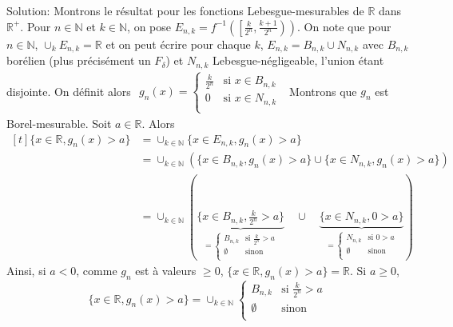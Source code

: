 \documentclass{report}
\begin{document}
Solution: Montrons le résultat pour les fonctions Lebesgue-mesurables de $\mathbb R$ dans $\mathbb R^+$. Pour $n\in \mathbb N$ et $k \in \mathbb N$, on pose $\displaystyle E_{n,k}=f^{-1}\left( \left[\frac{k}{2^n},\frac{k+1}{2^n}\right)\right)$.\newline
On note que pour $n\in \mathbb N$, $\cup_k E_{n,k} = \mathbb R$ et on peut écrire pour chaque $k$, \newline
$E_{n,k} = B_{n,k} \cup N_{n,k}$ avec $B_{n,k}$ borélien (plus précisément un $F_\delta$) et $N_{n,k}$ Lebesgue-négligeable, l'union étant disjointe.\newline
On définit alors $\begin{aligned}
  g_n(x)=
  \begin{cases}
    \frac{k}{2^n}  & \text{si }  x\in B_{n,k}\\
    0 & \text{si }  x\in N_{n,k}\\
  \end{cases}
\end{aligned}$\newline
Montrons que $g_n$ est Borel-mesurable. Soit $a\in \mathbb R$.\newline
Alors $\begin{aligned}[t] \{x\in \mathbb R, g_n(x)>a\} &= \cup_{k\in \mathbb N} \{x\in E_{n,k}, g_n(x)>a\}\\
&= \cup_{k\in \mathbb N} \left( \{x\in B_{n,k}, g_n(x)>a\} \cup \{x\in N_{n,k}, g_n(x)>a\} \right)\\
&= \cup_{k\in \mathbb N} ( \underbrace{\{x\in B_{n,k}, \frac{k}{2^n}>a\}}_{=\begin{cases}
    B_{n,k}  & \text{si }  \frac{k}{2^n}>a\\
    \emptyset & \text{sinon } \\
  \end{cases}} \quad \cup \quad \underbrace{\{x\in N_{n,k}, 0>a\}}_{=\begin{cases}
    N_{n,k}  & \text{si }  0>a\\
    \emptyset & \text{sinon } \\
  \end{cases}} ) 
\end{aligned}$
Ainsi, si $a<0$, comme $g_n$ est à valeurs $\geq 0$, $\{x\in \mathbb R, g_n(x)>a\} = \mathbb R$.\newline
Si $a\geq 0$, $$\{x\in \mathbb R, g_n(x)>a\} = \cup_{k\in \mathbb N} \begin{cases}
    B_{n,k}  & \text{si }  \frac{k}{2^n}>a\\
    \emptyset & \text{sinon } \\
  \end{cases}$$
\end{document}
